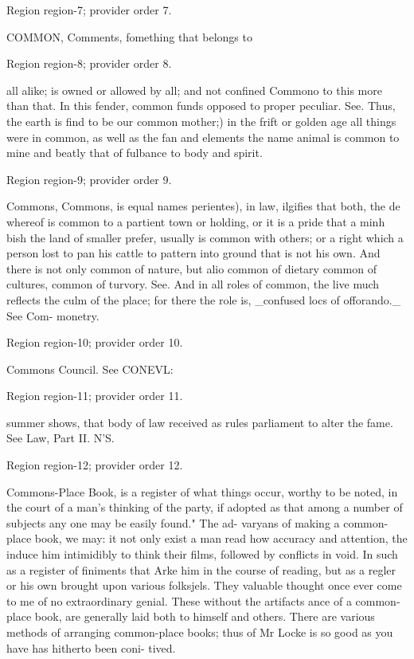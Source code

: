 \documentclass[11pt]{article}
\begin{document}
{\scriptsize\color{gray} Region region-7; provider order 7.\par}
\medskip

COMMON, Comments, fomething that belongs to
\par

{\scriptsize\color{gray} Region region-8; provider order 8.\par}
\medskip

all alike; is owned or allowed by all; and not confined Commono to this more than that. In this fender, common funds opposed to proper peculiar. See. Thus, the earth is find to be our common mother;) in the frift or golden age all things were in common, as well as the fan and elements the name animal is common to mine and beatly that of fulbance to body and spirit.
\par

{\scriptsize\color{gray} Region region-9; provider order 9.\par}
\medskip

Commons, Commons, is equal names perientes), in law, ilgifies that both, the de whereof is common to a partient town or holding, or it is a pride that a minh bish the land of smaller prefer, usually is common with others; or a right which a person lost to pan his cattle to pattern into ground that is not his own. And there is not only common of nature, but alio common of dietary common of cultures, common of turvory. See. And in all roles of common, the live much reflects the culm of the place; for there the role is, \_confused locs of offorando.\_ See Com- monetry.
\par

{\scriptsize\color{gray} Region region-10; provider order 10.\par}
\medskip

Commons Council. See CONEVL:
\par

{\scriptsize\color{gray} Region region-11; provider order 11.\par}
\medskip

summer shows, that body of law received as rules parliament to alter the fame. See Law, Part II. N’S.
\par

{\scriptsize\color{gray} Region region-12; provider order 12.\par}
\medskip

Commons-Place Book, is a register of what things occur, worthy to be noted, in the court of a man's thinking of the party, if adopted as that among a number of subjects any one may be easily found." The ad- varyans of making a common-place book, we may: it not only exist a man read how accuracy and attention, the induce him intimidibly to think their films, followed by conflicts in void. In such as a register of finiments that Arke him in the course of reading, but as a regler or his own brought upon various folksjels. They valuable thought once ever come to me of no extraordinary genial. These without the artifacts ance of a common-place book, are generally laid both to himself and others. There are various methods of arranging common-place books; thus of Mr Locke is so good as you have has hitherto been coni- tived.
\par
\end{document}
